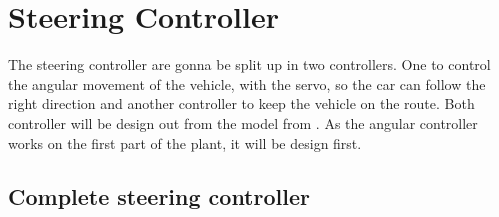 \section{Steering Controller}\label{sec:steeringController}
The steering controller are gonna be split up in two controllers. One to control the angular movement of the vehicle, with the servo, so the car can follow the right direction and another controller to keep the vehicle on the route. Both controller will be design out from the model from . As the angular controller works on the first part of the plant, it will be design first.





\subsection{Complete steering controller}

